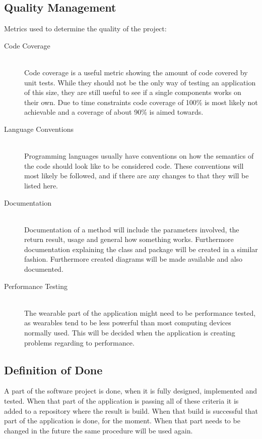 \subsection{Quality Management}

Metrics used to determine the quality of the project:

\begin{description}
	\item[Code Coverage] \hfill \\
		Code coverage is a useful metric showing the amount of code covered by unit tests. While they should not be the only way of testing an application of this size, they are still useful to see if a single components works on their own. Due to time constraints code coverage of 100\% is most likely not achievable and a coverage of about 90\% is aimed towards.
	\item[Language Conventions] \hfill \\
		Programming languages usually have conventions on how the semantics of the code should look like to be considered code. These conventions will most likely be followed, and if there are any changes to that they will be listed here.
	\item[Documentation] \hfill \\
		Documentation of a method will include the parameters involved, the return result, usage and general how something works. Furthermore documentation explaining the class and package will be created in a similar fashion. Furthermore created diagrams will be made available and also documented.
	\item[Performance Testing] \hfill \\
		The wearable part of the application might need to be performance tested, as wearables tend to be less powerful than most computing devices normally used. This will be decided when the application is creating problems regarding to performance.
\end{description}
\subsection{Definition of Done}
A part of the software project is done, when it is fully designed, implemented and tested. When that part of the application is passing all of these criteria it is added to a repository where the result is build. When that build is successful that part of the application is done, for the moment. When that part needs to be changed in the future the same procedure will be used again.